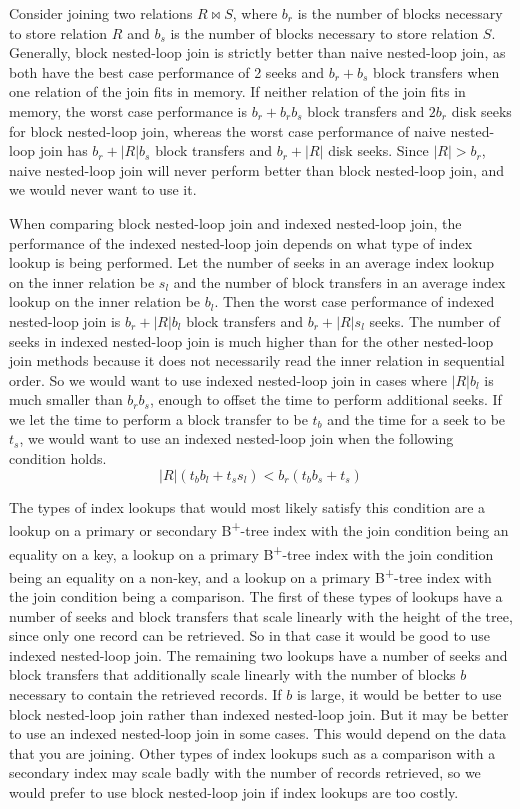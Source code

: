 \documentclass[12pt]{article}
\begin{document}
Consider joining two relations \(R \bowtie S\), where \(b_r\) is the number of blocks necessary to store relation \(R\) and \(b_s\) is the number of
blocks necessary to store relation \(S\). Generally, block nested-loop join is strictly better than naive nested-loop join, as both have the best
case performance of 2 seeks and \(b_r+b_s\) block transfers when one relation of the join fits in memory. If neither relation of the join fits in memory,
the worst case performance is \(b_r+b_rb_s\) block transfers and \(2b_r\) disk seeks for block nested-loop join, whereas the worst case performance
of naive nested-loop join has \(b_r+|R|b_s\) block transfers and \(b_r + |R|\) disk seeks. Since \(|R|>b_r\), naive nested-loop join will never perform
better than block nested-loop join, and we would never want to use it.

When comparing block nested-loop join and indexed nested-loop join, the performance of the indexed nested-loop join depends on what type of index lookup
is being performed. Let the number of seeks in an average index lookup on the inner relation be \(s_l\) and the number of block transfers in an average index lookup 
on the inner relation be \(b_l\). Then the worst case performance of indexed nested-loop join is \(b_r+|R|b_l\) block transfers and \(b_r+|R|s_l\) seeks. The
number of seeks in indexed nested-loop join is much higher than for the other nested-loop join methods because it does not necessarily read the inner relation
in sequential order. So we would want to use indexed nested-loop join in cases where \(|R|b_l\) is much smaller than \(b_rb_s\), enough to offset the time to
perform additional seeks. If we let the time to perform a block transfer to be \(t_b\) and the time for a seek to be \(t_s\), we would want to use an indexed
nested-loop join when the following condition holds.
\[|R|(t_bb_l+t_ss_l) < b_r(t_bb_s+t_s)\]

The types of index lookups that would most likely satisfy this condition are a lookup on a primary or secondary B\textsuperscript{+}-tree index with the
join condition being an equality on a key, a lookup on a primary B\textsuperscript{+}-tree index with the join condition being an equality on a non-key,
and a lookup on a primary B\textsuperscript{+}-tree index with the join condition being a comparison. The first of these types of lookups have a number of seeks
and block transfers that scale linearly with the height of the tree, since only one record can be retrieved. So in that case it would be good to use indexed nested-loop
join. The remaining two lookups have a number of seeks and block transfers that additionally scale linearly with the number of blocks \(b\) necessary to contain the
retrieved records. If \(b\) is  large, it would be better to use block nested-loop join rather than indexed nested-loop join. But it may be better to use an indexed nested-loop
join in some cases. This would depend on the data that you are joining. Other types of index lookups such as a comparison with a secondary index may scale badly
with the number of records retrieved, so we would prefer to use block nested-loop join if index lookups are too costly.
\end{document}
